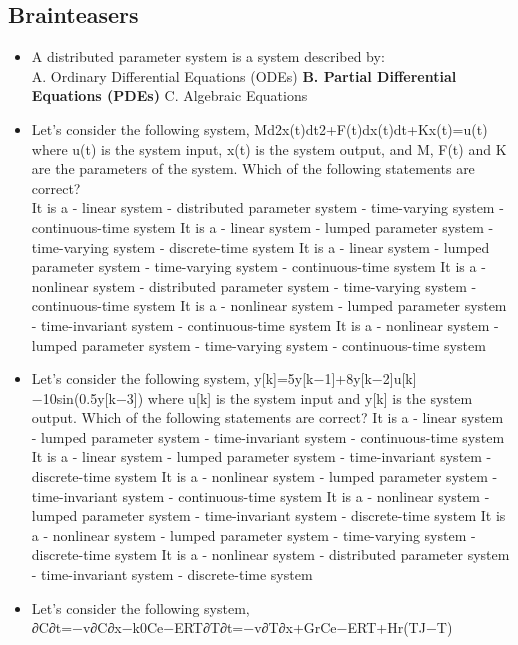 \documentclass{document}
\begin{document}
		\subsection{Brainteasers}
		\begin{itemize}
			\item A distributed parameter system is a system described by: \\
			A. Ordinary Differential Equations (ODEs)
			\textbf{B. Partial Differential Equations (PDEs)}
			C. Algebraic Equations
			\item Let's consider the following system,
			Md2x(t)dt2+F(t)dx(t)dt+Kx(t)=u(t)
			where u(t) is the system input, x(t) is the system output, and M, F(t) and K are the parameters of the system. Which of the following statements are correct?\\
			It is a
			- linear system
			- distributed parameter system
			- time-varying system
			​- continuous-time system
			It is a
			- linear system
			- lumped parameter system
			- time-varying system
			​- discrete-time system
			It is a
			- linear system
			- lumped parameter system
			- time-varying system
			​- continuous-time system
			It is a
			- nonlinear system
			- distributed parameter system
			- time-varying system
			​- continuous-time system
			It is a
			- nonlinear system
			- lumped parameter system
			- time-invariant system
			​- continuous-time system
			It is a
			- nonlinear system
			- lumped parameter system
			- time-varying system
			​- continuous-time system
			\item Let's consider the following system,
			y[k]=5y[k−1]+8y[k−2]u[k]−10sin(0.5y[k−3])
			where u[k] is the system input and y[k] is the system output. Which of the following statements are correct?
			It is a
			- linear system
			- lumped parameter system
			- time-invariant system
			​- continuous-time system
			It is a
			- linear system
			- lumped parameter system
			- time-invariant system
			​- discrete-time system
			It is a
			- nonlinear system
			- lumped parameter system
			- time-invariant system
			​- continuous-time system
			It is a
			- nonlinear system
			- lumped parameter system
			- time-invariant system
			​- discrete-time system
			It is a
			- nonlinear system
			- lumped parameter system
			- time-varying system
			​- discrete-time system
			It is a
			- nonlinear system
			- distributed parameter system
			- time-invariant system
			​- discrete-time system
			\item Let's consider the following system,
			∂C∂t=−v∂C∂x−k0Ce−ERT∂T∂t=−v∂T∂x+GrCe−ERT+Hr(TJ−T)

\end{itemize}
\end{document}
